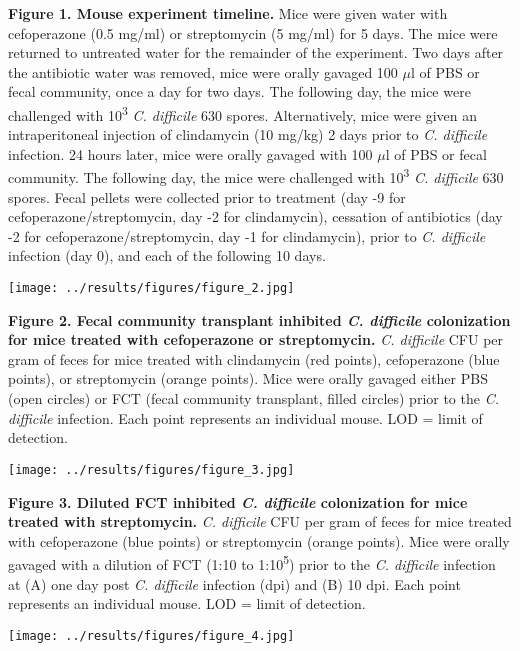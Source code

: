 \documentclass[
  12pt,
]{article}
\begin{document}
\textbf{Figure 1. Mouse experiment timeline.} Mice were given water with
cefoperazone (0.5 mg/ml) or streptomycin (5 mg/ml) for 5 days. The mice
were returned to untreated water for the remainder of the experiment.
Two days after the antibiotic water was removed, mice were orally
gavaged 100 \(\mu\)l of PBS or fecal community, once a day for two days.
The following day, the mice were challenged with 10\textsuperscript{3}
\emph{C. difficile} 630 spores. Alternatively, mice were given an
intraperitoneal injection of clindamycin (10 mg/kg) 2 days prior to
\emph{C. difficile} infection. 24 hours later, mice were orally gavaged
with 100 \(\mu\)l of PBS or fecal community. The following day, the mice
were challenged with 10\textsuperscript{3} \emph{C. difficile} 630
spores. Fecal pellets were collected prior to treatment (day -9 for
cefoperazone/streptomycin, day -2 for clindamycin), cessation of
antibiotics (day -2 for cefoperazone/streptomycin, day -1 for
clindamycin), prior to \emph{C. difficile} infection (day 0), and each
of the following 10 days.

\hfill\break

\texttt{[image: ../results/figures/figure\_2.jpg]}

\textbf{Figure 2. Fecal community transplant inhibited \emph{C.
difficile} colonization for mice treated with cefoperazone or
streptomycin.} \emph{C. difficile} CFU per gram of feces for mice
treated with clindamycin (red points), cefoperazone (blue points), or
streptomycin (orange points). Mice were orally gavaged either PBS (open
circles) or FCT (fecal community transplant, filled circles) prior to
the \emph{C. difficile} infection. Each point represents an individual
mouse. LOD = limit of detection.

\hfill\break

\texttt{[image: ../results/figures/figure\_3.jpg]}

\textbf{Figure 3. Diluted FCT inhibited \emph{C. difficile} colonization
for mice treated with streptomycin.} \emph{C. difficile} CFU per gram of
feces for mice treated with cefoperazone (blue points) or streptomycin
(orange points). Mice were orally gavaged with a dilution of FCT (1:10
to 1:10\textsuperscript{5}) prior to the \emph{C. difficile} infection
at (A) one day post \emph{C. difficile} infection (dpi) and (B) 10 dpi.
Each point represents an individual mouse. LOD = limit of detection.

\hfill\break

\texttt{[image: ../results/figures/figure\_4.jpg]}
\end{document}
